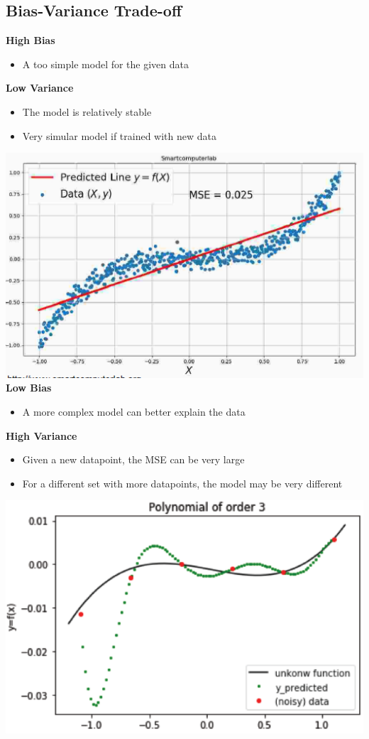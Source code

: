 \subsection{Bias-Variance Trade-off}
\textbf{High Bias}
\begin{itemize}
    \item A too simple model for the given data
\end{itemize}
\textbf{Low Variance}
\begin{itemize}
    \item The model is relatively stable
    \item Very simular model if trained with new data
\end{itemize}
\includegraphics[width=0.6\linewidth]{./img/bias_variance.png}\\
\textbf{Low Bias}
\begin{itemize}
    \item A more complex model can better explain the data
\end{itemize}
\textbf{High Variance}
\begin{itemize}
    \item Given a new datapoint, the MSE can be very large
    \item For a different set with more datapoints, the model may be very different
\end{itemize}
\includegraphics[width=0.6\linewidth]{./img/bias_variance2.png}

